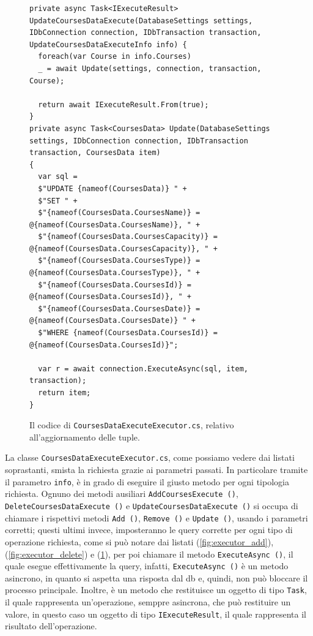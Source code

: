 \begin{figure}[H]
\begin{lstlisting}[linewidth=20cm, basicstyle=\tiny]
private async Task<IExecuteResult> UpdateCoursesDataExecute(DatabaseSettings settings, IDbConnection connection, IDbTransaction transaction, UpdateCoursesDataExecuteInfo info) {
  foreach(var Course in info.Courses)
  _ = await Update(settings, connection, transaction, Course);

  return await IExecuteResult.From(true);
}
private async Task<CoursesData> Update(DatabaseSettings settings, IDbConnection connection, IDbTransaction transaction, CoursesData item)
{
  var sql = 
  $"UPDATE {nameof(CoursesData)} " +
  $"SET " +
  $"{nameof(CoursesData.CoursesName)} = @{nameof(CoursesData.CoursesName)}, " +
  $"{nameof(CoursesData.CoursesCapacity)} = @{nameof(CoursesData.CoursesCapacity)}, " +
  $"{nameof(CoursesData.CoursesType)} = @{nameof(CoursesData.CoursesType)}, " +
  $"{nameof(CoursesData.CoursesId)} = @{nameof(CoursesData.CoursesId)}, " +
  $"{nameof(CoursesData.CoursesDate)} = @{nameof(CoursesData.CoursesDate)} " +
  $"WHERE {nameof(CoursesData.CoursesId)} = @{nameof(CoursesData.CoursesId)}";

  var r = await connection.ExecuteAsync(sql, item, transaction);
  return item;
}
\end{lstlisting}
\caption{\label{fig:executor_update}Il codice di \texttt{CoursesDataExecuteExecutor.cs}, relativo all'aggiornamento delle tuple.}
\end{figure}

La classe \texttt{CoursesDataExecuteExecutor.cs}, come possiamo vedere dai listati soprastanti, smista la richiesta grazie ai parametri passati. In particolare tramite il parametro \texttt{info}, è in grado di eseguire il giusto metodo per ogni tipologia richiesta.
Ognuno dei metodi ausiliari \texttt{AddCoursesExecute ()}, \texttt{DeleteCoursesDataExecute ()} e \texttt{UpdateCoursesDataExecute ()} si occupa di chiamare i rispettivi metodi \texttt{Add ()}, \texttt{Remove ()} e \texttt{Update ()}, usando i parametri corretti; questi ultimi invece, imposteranno le query corrette per ogni tipo di operazione richiesta, come si può notare dai listati (\ref{fig:executor_add}), (\ref{fig:executor_delete}) e (\ref{fig:executor_update}), per poi chiamare il metodo \texttt{ExecuteAsync ()}, il quale esegue effettivamente la query, infatti, \texttt{ExecuteAsync ()} è un metodo asincrono, in quanto si aspetta una risposta dal \acrshort{db} e, quindi, non può bloccare il processo principale. 
Inoltre, è un metodo che restituisce un oggetto di tipo \texttt{Task}, il quale rappresenta un'operazione, semppre asincrona, che può restituire un valore, in questo caso un oggetto di tipo \texttt{IExecuteResult}, il quale rappresenta il risultato dell'operazione.\newline

